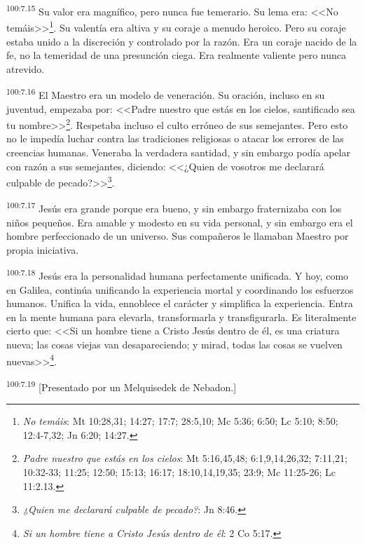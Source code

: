 \par
\textsuperscript{100:7.15} Su valor era magnífico, pero nunca fue temerario. Su lema era: <<No temáis>>\footnote{\textit{No temáis}: Mt 10:28,31; 14:27; 17:7; 28:5,10; Mc 5:36; 6:50; Lc 5:10; 8:50; 12:4-7,32; Jn 6:20; 14:27.}. Su valentía era altiva y su coraje a menudo heroico. Pero su coraje estaba unido a la discreción y controlado por la razón. Era un coraje nacido de la fe, no la temeridad de una presunción ciega. Era realmente valiente pero nunca atrevido.

\par
\textsuperscript{100:7.16} El Maestro era un modelo de veneración. Su oración, incluso en su juventud, empezaba por: <<Padre nuestro que estás en los cielos, santificado sea tu nombre>>\footnote{\textit{Padre nuestro que estás en los cielos}: Mt 5:16,45,48; 6:1,9,14,26,32; 7:11,21; 10:32-33; 11:25; 12:50; 15:13; 16:17; 18:10,14,19,35; 23:9; Mc 11:25-26; Lc 11:2.13.}. Respetaba incluso el culto erróneo de sus semejantes. Pero esto no le impedía luchar contra las tradiciones religiosas o atacar los errores de las creencias humanas. Veneraba la verdadera santidad, y sin embargo podía apelar con razón a sus semejantes, diciendo: <<¿Quien de vosotros me declarará culpable de pecado?>>\footnote{\textit{¿Quien me declarará culpable de pecado?}: Jn 8:46.}.

\par
\textsuperscript{100:7.17} Jesús era grande porque era bueno, y sin embargo fraternizaba con los niños pequeños. Era amable y modesto en su vida personal, y sin embargo era el hombre perfeccionado de un universo. Sus compañeros le llamaban Maestro por propia iniciativa.

\par
\textsuperscript{100:7.18} Jesús era la personalidad humana perfectamente unificada. Y hoy, como en Galilea, continúa unificando la experiencia mortal y coordinando los esfuerzos humanos. Unifica la vida, ennoblece el carácter y simplifica la experiencia. Entra en la mente humana para elevarla, transformarla y transfigurarla. Es literalmente cierto que: <<Si un hombre tiene a Cristo Jesús dentro de él, es una criatura nueva; las cosas viejas van desapareciendo; y mirad, todas las cosas se vuelven nuevas>>\footnote{\textit{Si un hombre tiene a Cristo Jesús dentro de él}: 2 Co 5:17.}.

\par
\textsuperscript{100:7.19} [Presentado por un Melquisedek de Nebadon.]